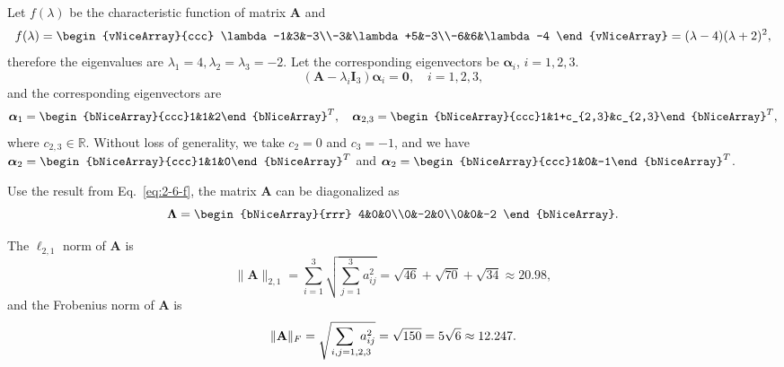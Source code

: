 \documentclass[solution]{seu-ml-assign}
\begin{document}
\subproblem{}
Let $f(\lambda)$ be the characteristic function of matrix $\mathbf{A}$ and
\begin{equation}\label{eq:2-6-f}
    f(\lambda)=\begin{vNiceArray}{ccc}
        \lambda-1&3&-3\\-3&\lambda+5&-3\\-6&6&\lambda-4
    \end{vNiceArray}=(\lambda-4)(\lambda+2)^2,
\end{equation}
therefore the eigenvalues are $\lambda_1=4, \lambda_2=\lambda_3=-2$.
Let the corresponding eigenvectors be $\bm{\alpha}_i$, $i=1,2,3$.
\begin{equation}
    (\mathbf{A}-\lambda_i\mathbf{I}_3)\bm{\alpha}_i=\mathbf{0},\quad i=1,2,3,
\end{equation}
and the corresponding eigenvectors are
\begin{equation}
    \bm{\alpha}_1=\begin{bNiceArray}{ccc}1&1&2\end{bNiceArray}^T,\quad
    \bm{\alpha}_{2,3}=\begin{bNiceArray}{ccc}1&1+c_{2,3}&c_{2,3}\end{bNiceArray}^T,
\end{equation}
where $c_{2,3}\in\mathbb{R}$.
Without loss of generality, we take $c_2=0$ and $c_3=-1$, and we have $\bm{\alpha}_2=\begin{bNiceArray}{ccc}1&1&0\end{bNiceArray}^T$ and $\bm{\alpha}_2=\begin{bNiceArray}{ccc}1&0&-1\end{bNiceArray}^T$.

\subproblem{}
Use the result from Eq.~\eqref{eq:2-6-f}, the matrix $\mathbf{A}$ can be diagonalized as
\begin{equation}
    \bm{\Lambda}=\begin{bNiceArray}{rrr}
        4&0&0\\0&-2&0\\0&0&-2
    \end{bNiceArray}.
\end{equation}

\subproblem{}
The $\ell_{2,1}$ norm of $\mathbf{A}$ is
\begin{equation}
    \|\mathbf{A}\|_{2,1}=\sum_{i=1}^3\sqrt{\sum_{j=1}^3a_{ij}^2}=\sqrt{46}+\sqrt{70}+\sqrt{34}\approx 20.98,
\end{equation}
and the Frobenius norm of $\mathbf{A}$ is
\begin{equation}
    \|\mathbf{A}\|_F=\sqrt{\sum_{i,j=1,\mathrlap{2,3}}a_{ij}^2}=\sqrt{150}=5\sqrt{6}\approx 12.247.
\end{equation}
\end{document}
